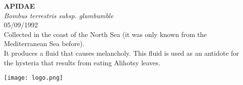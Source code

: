 \documentclass[
  landscape]{article}
\begin{document}
\begin{mdframed}[linecolor=mycolortext, linewidth=2pt, backgroundcolor=mycolor]

  \bigskip
  \begin{flushright}
  \begin{minipage}[t][-50ex][t]{16em}  
  \end{minipage}
  \end{flushright}
  \bigskip
  \begin{adjustwidth}{1cm}{1cm}
  {\fontsize{50pt}{0pt}\selectfont\bf\textcolor{mycolortext}{ APIDAE }} \\
  \linebreak
  \linebreak
  {\fontsize{40pt}{100pt}\selectfont\textcolor{mycolortext}{\emph{ Bombus terrestris subsp. glumbumble }}} \\
  \vfill
  {\fontsize{30pt}{100pt}\selectfont\textcolor{mycolortext}{ 05/09/1992 }} \\
  \vfill
  {\fontsize{30pt}{100pt}\selectfont\textcolor{mycolortext}{ Collected in the coast of the North Sea (it was only known from the Mediterranean Sea before). }} \\
  \vfill
  {\fontsize{30pt}{50pt}\selectfont\textcolor{mycolortext}{ It produces a fluid that causes melancholy. This fluid is used as an antidote for the hysteria that results from eating Alihotsy leaves. }} \\
  \end{adjustwidth}
  \begin{center}
  \texttt{[image: logo.png]}
  \end{center}
  \end{mdframed}
  \pagebreak

\end{document}
